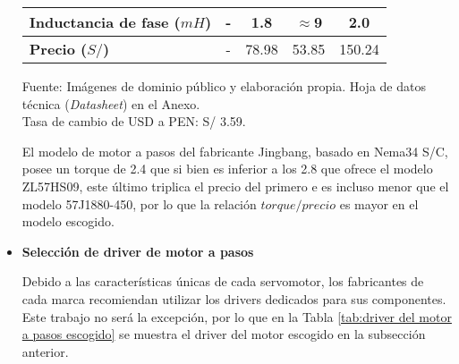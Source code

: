 \begin{itemize}
\begin{mytable}[H]
\begin{tabular}{l|c|c|c|c|}
			\multicolumn{1}{|l|}{\textbf{Inductancia de fase ($mH$)}}& - & 1.8 & $\approx$9 & 2.0 \\ \hline
			\multicolumn{1}{|l|}{\textbf{Precio ($S/$)}}& - & 78.98 & 53.85 & 150.24 \\ \hline
		\end{tabular}
		\begin{myflushcenteraftertable}	
			Fuente: Imágenes de dominio público y elaboración propia. Hoja de datos técnica (\textit{Datasheet}) en el Anexo. \\
			Tasa de cambio de USD a PEN: S/ 3.59.
		\end{myflushcenteraftertable}
	\end{mytable}
	
	El modelo de motor a pasos del fabricante Jingbang, basado en Nema34 S/C, posee un torque de 2.4 que si bien es inferior a los 2.8 que ofrece el modelo ZL57HS09, este último triplica el precio del primero e es incluso menor que el modelo 57J1880-450, por lo que la relación $torque/precio$ es mayor en el modelo escogido.
	
	\item \textbf{Selección de driver de motor a pasos}
	
	Debido a las características únicas de cada servomotor, los fabricantes de cada marca recomiendan utilizar los drivers dedicados para sus componentes. Este trabajo no será la excepción, por lo que en la Tabla \ref{tab:driver del motor a pasos escogido} se muestra el driver del motor escogido en la subsección anterior.
	

\end{itemize}

